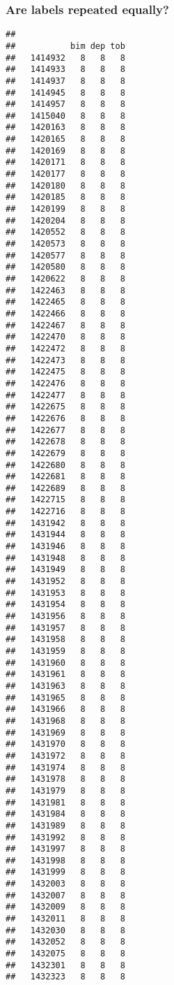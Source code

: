 \documentclass[
]{article}
\newenvironment{Shaded}{\begin{snugshade}}{\end{snugshade}}
\newcommand{\KeywordTok}[1]{\textcolor[rgb]{0.13,0.29,0.53}{\textbf{#1}}}
\newcommand{\NormalTok}[1]{#1}
\newcommand{\OperatorTok}[1]{\textcolor[rgb]{0.81,0.36,0.00}{\textbf{#1}}}
\begin{document}
\hypertarget{are-labels-repeated-equally}{%
\subsubsection{Are labels repeated
equally?}\label{are-labels-repeated-equally}}

\begin{Shaded}
\end{Shaded}

\begin{verbatim}
##          
##           bim dep tob
##   1414932   8   8   8
##   1414933   8   8   8
##   1414937   8   8   8
##   1414945   8   8   8
##   1414957   8   8   8
##   1415040   8   8   8
##   1420163   8   8   8
##   1420165   8   8   8
##   1420169   8   8   8
##   1420171   8   8   8
##   1420177   8   8   8
##   1420180   8   8   8
##   1420185   8   8   8
##   1420199   8   8   8
##   1420204   8   8   8
##   1420552   8   8   8
##   1420573   8   8   8
##   1420577   8   8   8
##   1420580   8   8   8
##   1420622   8   8   8
##   1422463   8   8   8
##   1422465   8   8   8
##   1422466   8   8   8
##   1422467   8   8   8
##   1422470   8   8   8
##   1422472   8   8   8
##   1422473   8   8   8
##   1422475   8   8   8
##   1422476   8   8   8
##   1422477   8   8   8
##   1422675   8   8   8
##   1422676   8   8   8
##   1422677   8   8   8
##   1422678   8   8   8
##   1422679   8   8   8
##   1422680   8   8   8
##   1422681   8   8   8
##   1422689   8   8   8
##   1422715   8   8   8
##   1422716   8   8   8
##   1431942   8   8   8
##   1431944   8   8   8
##   1431946   8   8   8
##   1431948   8   8   8
##   1431949   8   8   8
##   1431952   8   8   8
##   1431953   8   8   8
##   1431954   8   8   8
##   1431956   8   8   8
##   1431957   8   8   8
##   1431958   8   8   8
##   1431959   8   8   8
##   1431960   8   8   8
##   1431961   8   8   8
##   1431963   8   8   8
##   1431965   8   8   8
##   1431966   8   8   8
##   1431968   8   8   8
##   1431969   8   8   8
##   1431970   8   8   8
##   1431972   8   8   8
##   1431974   8   8   8
##   1431978   8   8   8
##   1431979   8   8   8
##   1431981   8   8   8
##   1431984   8   8   8
##   1431989   8   8   8
##   1431992   8   8   8
##   1431997   8   8   8
##   1431998   8   8   8
##   1431999   8   8   8
##   1432003   8   8   8
##   1432007   8   8   8
##   1432009   8   8   8
##   1432011   8   8   8
##   1432030   8   8   8
##   1432052   8   8   8
##   1432075   8   8   8
##   1432301   8   8   8
##   1432323   8   8   8
\end{verbatim}
\end{document}
